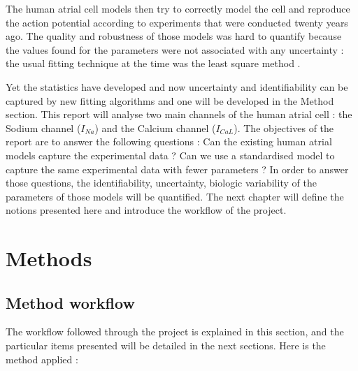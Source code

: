 \documentclass[11pt]{report}
\begin{document}
The human atrial cell models then try to correctly model the cell and reproduce the action potential according to experiments that were conducted twenty years ago. The quality and robustness of those models was hard to quantify because the values found for the parameters were not associated with any uncertainty : the usual fitting technique at the time was the least square method \cite{Sakakibara1992}. 

Yet the statistics have developed and now uncertainty and identifiability can be captured by new fitting algorithms and one will be developed in the Method section. This report will analyse two main channels of the human atrial cell : the Sodium channel ($I_{Na}$) and the Calcium channel ($I_{Ca L}$). The objectives of the report are to answer the following questions :
Can the existing human atrial models capture the experimental data ?
Can we use a standardised model to capture the same experimental data with fewer parameters ?
In order to answer those questions, the identifiability, uncertainty, biologic variability of the parameters of those models will be quantified.
The next chapter will define the notions presented here and introduce the workflow of the project.





\chapter{Methods}

\section{Method workflow}

The workflow followed through the project is explained in this section, and the particular items presented will be detailed in the next sections.
Here is the method applied :
\end{document}
